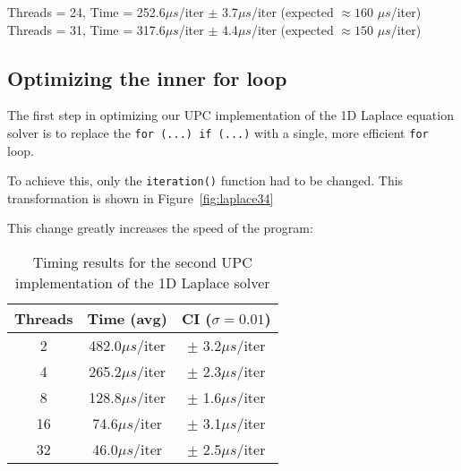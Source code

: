 \documentclass[12pt]{article}
\newcommand{\us}[0]{${\mu}s$}
\begin{document}
\begin{center}
  Threads = 24, \quad Time = 252.6\us/iter $\pm$ 3.7\us/iter \enspace (expected $\approx 160$ \us/iter) \\
  Threads = 31, \quad Time = 317.6\us/iter $\pm$ 4.4\us/iter \enspace (expected $\approx 150$ \us/iter)
\end{center}



\subsection{Optimizing the inner for loop}

The first step in optimizing our UPC implementation of the 1D Laplace equation solver is to replace the \texttt{for (...) if (...)} with a single, more efficient \texttt{for} loop.

To achieve this, only the \texttt{iteration()} function had to be changed.
This transformation is shown in Figure~\ref{fig:laplace34}

This change greatly increases the speed of the program:

\begin{table}[ht]
  \centering\begin{tabular}{|c|c|c|}
    \hline
    Threads & Time (avg) & CI ($\sigma=0.01$) \\
    \hline
    2 & 482.0\us/iter & $\pm$ 3.2\us/iter \\
    4 & 265.2\us/iter & $\pm$ 2.3\us/iter \\
    8 & 128.8\us/iter & $\pm$ 1.6\us/iter \\
    16 & 74.6\us/iter & $\pm$ 3.1\us/iter \\
    32 & 46.0\us/iter & $\pm$ 2.5\us/iter \\
    \hline
  \end{tabular}
  \caption{Timing results for the second UPC implementation of the 1D Laplace solver}
  \label{tab:laplace4}
\end{table}
\end{document}
